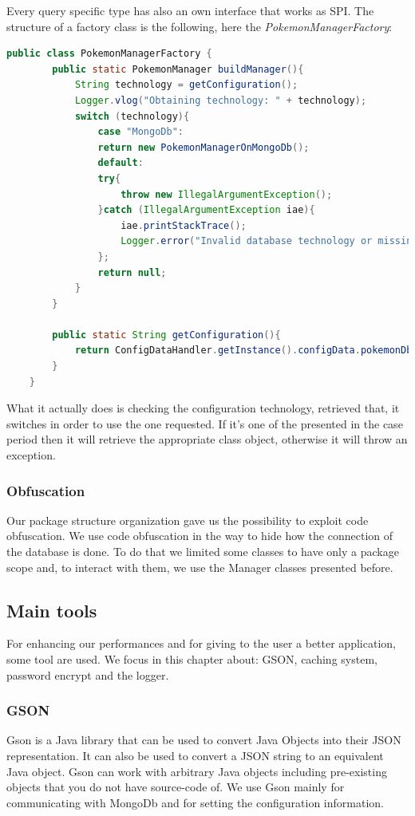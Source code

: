 Every query specific type has also an own interface that works as SPI.
The structure of a factory class is the following, here the \textit{PokemonManagerFactory}:

\begin{lstlisting}[language=Java]
	public class PokemonManagerFactory {
		public static PokemonManager buildManager(){
			String technology = getConfiguration();
			Logger.vlog("Obtaining technology: " + technology);
			switch (technology){
				case "MongoDb":
				return new PokemonManagerOnMongoDb();
				default:
				try{
					throw new IllegalArgumentException();
				}catch (IllegalArgumentException iae){
					iae.printStackTrace();
					Logger.error("Invalid database technology or missing implementation");
				};
				return null;
			}
		}
		
		public static String getConfiguration(){
			return ConfigDataHandler.getInstance().configData.pokemonDbArchitecture;
		}
	}
\end{lstlisting}

What it actually does is checking the configuration technology, retrieved that, it switches in order to use the one requested. If it’s one of the presented in the case period then it will retrieve the appropriate class object, otherwise it will throw an exception.

\subsubsection{Obfuscation}
Our package structure organization gave us the possibility to exploit code obfuscation. We use code obfuscation in the way to hide how the connection of the database is done. To do that we limited some classes to have only a package scope and, to interact with them, we use the Manager classes presented before.


\subsection{Main tools}
For enhancing our performances and for giving to the user a better application, some tool are used. We focus in this chapter about: GSON, caching system, password encrypt and the logger.
\subsubsection{GSON}
Gson is a Java library that can be used to convert Java Objects into their JSON representation. It can also be used to convert a JSON string to an equivalent Java object. Gson can work with arbitrary Java objects including pre-existing objects that you do not have source-code of.
We use Gson mainly for communicating with MongoDb and for setting the configuration information.
